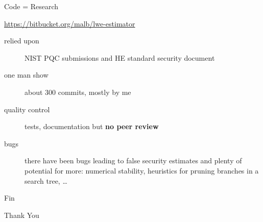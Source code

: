 \documentclass[presentation,smaller]{beamer}
\begin{document}
\begin{frame}[label={sec:orgf6b4de7}]{Code = Research}
\begin{center}
\url{https://bitbucket.org/malb/lwe-estimator}
\end{center}

\begin{description}
\item[{relied upon}] NIST PQC submissions and HE standard security document
\item[{one man show}] about 300 commits, mostly by me
\item[{quality control}] tests, documentation but \textbf{no peer review}
\item[{bugs}] there have been bugs leading to false security estimates and plenty of potential for more: numerical stability, heuristics for pruning branches in a search tree, …
\end{description}
\end{frame}

\begin{frame}[label={sec:orge8cc5d8},standout]{Fin}
\begin{center}
\Huge \alert{Thank You}
\end{center}
\end{frame}
\end{document}
